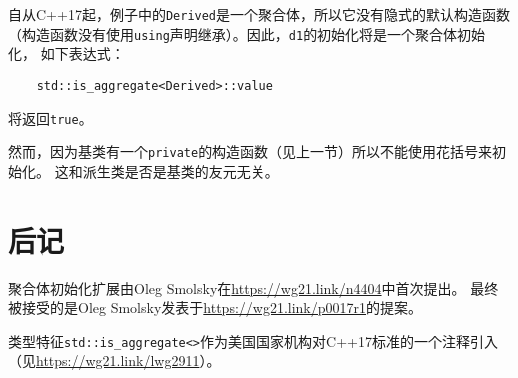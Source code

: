 自从C++17起，例子中的\texttt{Derived}是一个聚合体，所以它没有隐式的默认构造函数
（构造函数没有使用\texttt{using}声明继承）。因此，\texttt{d1}的初始化将是一个聚合体初始化，
如下表达式：
\begin{lstlisting}
    std::is_aggregate<Derived>::value
\end{lstlisting}
将返回\texttt{true}。

然而，因为基类有一个\texttt{private}的构造函数（见上一节）所以不能使用花括号来初始化。
这和派生类是否是基类的友元无关。

\section{后记}
聚合体初始化扩展由Oleg Smolsky在\url{https://wg21.link/n4404}中首次提出。
最终被接受的是Oleg Smolsky发表于\url{https://wg21.link/p0017r1}的提案。

类型特征\texttt{std::is\_aggregate<>}作为美国国家机构对C++17标准的一个注释引入
（见\url{https://wg21.link/lwg2911}）。